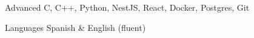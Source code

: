 
\begin{cvskills}

  \cvskill
    {Advanced}
    {C, C++, Python, NestJS, React, Docker, Postgres, Git}

  \cvskill
    {Languages}
    {Spanish \& English (fluent)}

\end{cvskills}
